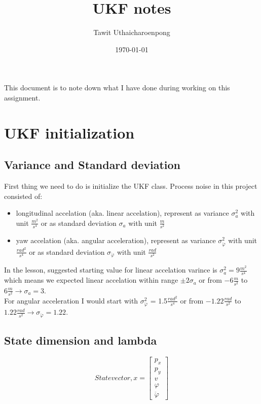 \documentclass{article}
\author{Tawit Uthaicharoenpong}
\title{UKF notes}
\date{\today}
\begin{document}
\maketitle

This document is to note down what I have done during working on this assignment.

\section{UKF initialization}
\subsection{Variance and Standard deviation}
First thing we need to do is initialize the UKF class.
Process noise in this project consisted of:

\begin{itemize}
    \item longitudinal accelation (aka. linear accelation), represent as variance \(\sigma^2_a\) 
    with unit \( \frac{m^2}{s^4}\) or as standard deviation \(\sigma_a\) with unit \(\frac{m}{s^2}\)

    \item yaw accelation (aka. angular acceleration), represent as variance \(\sigma^2_{\ddot{\varphi}}\)
    with unit \(\frac{rad^2}{s^4}\) or as standard deviation \(\sigma_{\ddot{\varphi}}\) with unit \(\frac{rad}{s^2}\)
\end{itemize}

In the lesson, suggested starting value for linear accelation varince is \(\sigma^2_a = 9 \frac{m^2}{s^4}\) which means we expected linear accelation within range \(\pm 2\sigma_a\) or from \(-6\frac{m}{s^2}\) to \(6\frac{m}{s^2} \rightarrow 
\sigma_a = 3\).\\

For angular acceleration I would start with \(\sigma^2_{\ddot{\varphi}}\) = 1.5\(\frac{rad^2}{s^4}\) or from 
\(-1.22\frac{rad}{s^2}\) to \(1.22\frac{rad}{s^2} \rightarrow \sigma_{\ddot{\varphi}}=1.22\).\\


\subsection{State dimension and lambda}
\[
State vector, x =
\begin{bmatrix}
p_x \\ p_y \\ v \\ \varphi \\ \ddot{\varphi}
\end{bmatrix}
\]
\end{document}

